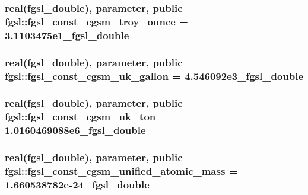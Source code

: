 \hypertarget{classfgsl_aa2e9facb3d97dfb32697727764bbd619}{
\subsubsection[{fgsl\-\_\-const\-\_\-cgsm\-\_\-troy\-\_\-ounce}]{\setlength{\rightskip}{0pt plus 5cm}real({\bf fgsl\-\_\-double}), parameter, public fgsl\-::fgsl\-\_\-const\-\_\-cgsm\-\_\-troy\-\_\-ounce = 3.\-1103475e1\-\_\-fgsl\-\_\-double}}\label{classfgsl_aa2e9facb3d97dfb32697727764bbd619}
\hypertarget{classfgsl_aaa815df0586e577834ad13d9b6dd8218}{
\subsubsection[{fgsl\-\_\-const\-\_\-cgsm\-\_\-uk\-\_\-gallon}]{\setlength{\rightskip}{0pt plus 5cm}real({\bf fgsl\-\_\-double}), parameter, public fgsl\-::fgsl\-\_\-const\-\_\-cgsm\-\_\-uk\-\_\-gallon = 4.\-546092e3\-\_\-fgsl\-\_\-double}}\label{classfgsl_aaa815df0586e577834ad13d9b6dd8218}
\hypertarget{classfgsl_abcaa9958fedcc17e52fb560e58639633}{
\subsubsection[{fgsl\-\_\-const\-\_\-cgsm\-\_\-uk\-\_\-ton}]{\setlength{\rightskip}{0pt plus 5cm}real({\bf fgsl\-\_\-double}), parameter, public fgsl\-::fgsl\-\_\-const\-\_\-cgsm\-\_\-uk\-\_\-ton = 1.\-0160469088e6\-\_\-fgsl\-\_\-double}}\label{classfgsl_abcaa9958fedcc17e52fb560e58639633}
\hypertarget{classfgsl_a6b7f3fbb6b2b1c225cab4719706b6d59}{
\subsubsection[{fgsl\-\_\-const\-\_\-cgsm\-\_\-unified\-\_\-atomic\-\_\-mass}]{\setlength{\rightskip}{0pt plus 5cm}real({\bf fgsl\-\_\-double}), parameter, public fgsl\-::fgsl\-\_\-const\-\_\-cgsm\-\_\-unified\-\_\-atomic\-\_\-mass = 1.\-660538782e-\/24\-\_\-fgsl\-\_\-double}}\label{classfgsl_a6b7f3fbb6b2b1c225cab4719706b6d59}
